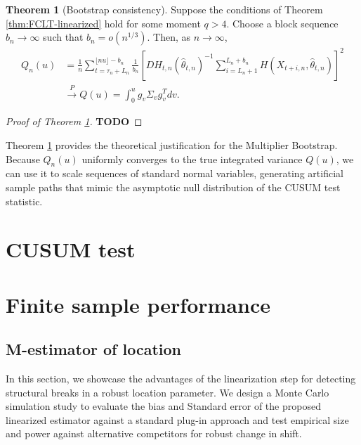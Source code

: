\documentclass[10pt, a4paper]{article}
\theoremstyle{assumption}
\theoremstyle{definition}
\theoremstyle{theorem}
\newtheorem{theorem}{Theorem}[section]
\begin{document}
\begin{shaded}
\begin{theorem}[Bootstrap consistency]\label{thm: variance_consistency}
Suppose the conditions of Theorem \ref{thm:FCLT-linearized} hold for some moment $q > 4$. Choose a block sequence $b_n \to \infty$ such that $b_n = o(n^{1/3})$. Then, as $n \to \infty$,
\begin{align*}
    Q_n(u) & =  \frac{1}{n} \sum_{t=\tau_n+L_n}^{\lfloor nu \rfloor - b_n} \frac{1}{b_n} \left[ DH_{t,n}(\widehat{\theta}_{t,n})^{-1} \sum_{i=L_n+1}^{L_n+b_n} H(X_{t+i,n}, \widehat{\theta}_{t,n})\right]^2 \\ &\xrightarrow{P} Q(u) = \int_0^u g_v \Sigma_v g_v^T dv.
    \ 
\end{align*}
\end{theorem}
\end{shaded}

\begin{proof}[Proof of Theorem \ref{thm: variance_consistency}]
    \color{blue}\textbf{TODO}\color{black}
\end{proof}

Theorem \ref{thm: variance_consistency} provides the theoretical justification for the Multiplier Bootstrap. Because $Q_n(u)$ uniformly converges to the true integrated variance $Q(u)$, we can use it to scale sequences of standard normal variables, generating artificial sample paths that mimic the asymptotic null distribution of the CUSUM test statistic.



\section{CUSUM test}





\section{Finite sample performance}
\subsection{M-estimator of location}
\label{sec:simulation_robust_location}

In this section, we showcase the advantages of the linearization step for detecting structural breaks in a robust location parameter. We design a Monte Carlo simulation study to evaluate the bias and Standard error of the proposed linearized estimator against a standard plug-in approach and test empirical size and power against alternative competitors for robust change in shift. 
\end{document}
